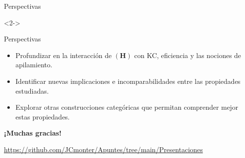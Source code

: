 \documentclass[compress,12pt]{beamer}
\begin{document}
\begin{frame}{Perspectivas}
    \begin{uncoverenv}<2->
\begin{block}{Perspectivas}
\begin{itemize}
    \item Profundizar en la interacción de
    $\mathbf{(H)}$ con KC, eficiencia y
    las nociones de apilamiento.

    \item Identificar nuevas implicaciones
    e incomparabilidades entre las
    propiedades estudiadas.

    \item Explorar otras construcciones
    categóricas que permitan comprender
    mejor estas propiedades.
\end{itemize}
\end{block}
\end{uncoverenv}
\end{frame}

\End

\begin{frame}[allowframebreaks]

%
%

\end{frame}

\begin{frame}
    \centering

    {\Huge\bfseries
    \smiley¡Muchas gracias!\smiley

    \scalebox{4}{\faGithub}\par\bigskip
    }

    {\fontsize{8}{10}\selectfont
    \url{https://github.com/JCmonter/Apuntes/tree/main/Presentaciones}
    }

\end{frame}
\end{document}
